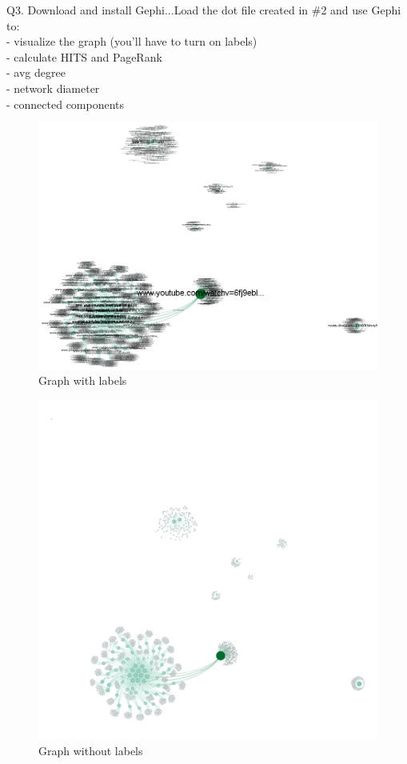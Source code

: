\documentclass{article}
\begin{document}
Q3. Download and install Gephi...Load the dot file created in \#2 and use Gephi
to:\\
- visualize the graph (you'll have to turn on labels)\\
- calculate HITS and PageRank\\
- avg degree\\
- network diameter\\
- connected components\\
\vfill
\graphicspath{{q3/}}
\begin{figure}
  \centering
  \caption{Graph with labels}
  \includegraphics[scale=.35]{graph.png}
\end{figure}
\begin{figure}
  \centering
  \caption{Graph without labels}
  \includegraphics[scale=.35]{graphNoLabels.png}
\end{figure}
\end{document}
